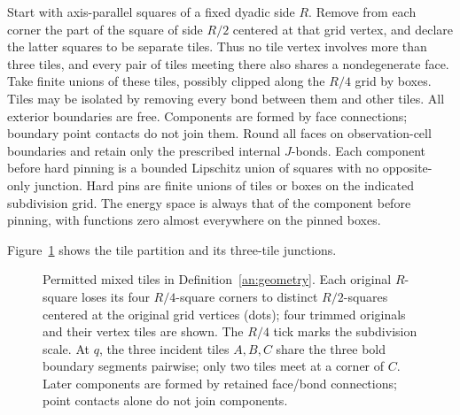 \begin{definition}\label{an:geometry}
Start with axis-parallel squares of a fixed dyadic side $R$.
Remove from each corner the part of the square of side $R/2$
centered at that grid vertex, and declare the latter squares
to be separate tiles.  Thus no tile vertex involves more than
three tiles, and every pair of tiles meeting there also shares
a nondegenerate face.  Take finite unions of these tiles,
possibly clipped along the $R/4$ grid by boxes.  Tiles may be
isolated by removing every bond between them and other tiles.
All exterior boundaries are free.  Components are formed by
face connections; boundary point contacts do not join them.
Round all faces on observation-cell boundaries and retain only
the prescribed internal $J$-bonds.  Each component before hard
pinning is a bounded Lipschitz union of squares with no
opposite-only junction.  Hard pins are finite unions of tiles
or boxes on the indicated subdivision grid.  The energy space
is always that of the component before pinning, with functions
zero almost everywhere on the pinned boxes.
\end{definition}

Figure~\ref{an:mixed-geometry-figure} shows the tile partition and its
three-tile junctions.

\begin{figure}[tb]
\centering
{}
\caption{Permitted mixed tiles in Definition~\ref{an:geometry}.  Each original $R$-square loses its four
$R/4$-square corners to distinct $R/2$-squares centered at the original
grid vertices (dots); four trimmed originals and their vertex tiles
are shown.  The $R/4$ tick marks the subdivision scale.  At $q$, the
three incident tiles $A,B,C$ share the three bold boundary segments pairwise;
only two tiles meet at a corner of $C$.
Later components are formed by retained face/bond connections;
point contacts alone do not join components.}
\label{an:mixed-geometry-figure}
\end{figure}

